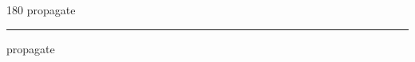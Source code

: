 
\begin{frame}
\begin{center}
\begin{turn}{180}
{\fontsize{2.5cm}{1em}\selectfont propagate}
\end{turn}
\vspace{1em}\par  
\hrule
\vspace{1em}\par  
{\fontsize{2.5cm}{1em}\selectfont propagate}
\end{center}
\end{frame}
